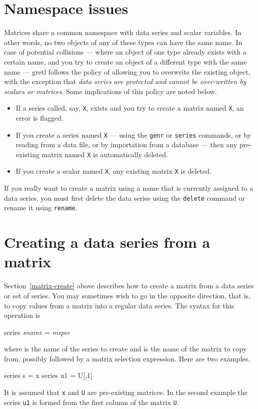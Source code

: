 \section{Namespace issues}
\label{matrix-namespace}

Matrices share a common namespace with data series and scalar
variables.  In other words, no two objects of any of these types can
have the same name.  In case of potential collisions --- where an
object of one type already exists with a certain name, and you try to
create an object of a different type with the same name --- gretl
follows the policy of allowing you to overwrite the existing object, 
with the exception that \textit{data series are protected and cannot be
over-written by scalars or matrices}.  Some implications of this
policy are noted below.
%
\begin{itemize}
\item If a series called, say, \texttt{X}, exists and you try to
  create a matrix named \texttt{X}, an error is flagged.
\item If you create a series named \texttt{X} --- using the
  \texttt{genr} or \texttt{series} commands, or by reading from a data
  file, or by importation from a database --- then any pre-existing
  matrix named \texttt{X} is automatically deleted.
\item If you create a scalar named \texttt{X}, any existing matrix
  \texttt{X} is deleted.
\end{itemize}
%
If you really want to create a matrix using a name that is currently
assigned to a data series, you must first delete the data series using
the \texttt{delete} command or rename it using \texttt{rename}.

\section{Creating a data series from a matrix}
\label{matrix-create-series}

Section~\ref{matrix-create} above describes how to create a matrix
from a data series or set of series.  You may sometimes wish to go in
the opposite direction, that is, to copy values from a matrix 
into a regular data series.  The syntax for this operation is
%
\begin{textcode}
series \textsl{sname} = \textsl{mspec}
\end{textcode}
%
where  is the name of the series to create and
 is the name of the matrix to copy from, possibly followed
by a matrix selection expression.  Here are two examples.
%
\begin{code}
series s = x
series u1 = U[,1]
\end{code}
%
It is assumed that \texttt{x} and \texttt{U} are pre-existing
matrices.  In the second example the series \texttt{u1} is formed from
the first column of the matrix \texttt{U}.

